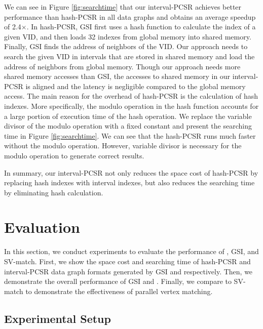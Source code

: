 We can see in Figure \ref{fig:searchtime} that our interval-PCSR achieves better performance than hash-PCSR in all data graphs and obtains
an average speedup of 2.4$\times$. In hash-PCSR, GSI first uses a hash function to calculate the index of a given VID, and then loads 32
indexes from global memory into shared memory. Finally, GSI finds the address of neighbors of the VID. Our approach needs to search the
given VID in intervals that are stored in shared memory and load the address of neighbors from global memory. Though our approach needs
more shared memory accesses than GSI, the accesses to shared memory in our interval-PCSR is aligned and the latency is negligible compared
to the global memory access. The main reason for the overhead of hash-PCSR is the calculation of hash indexes. More specifically, the
modulo operation in the hash function accounts for a large portion of execution time of the hash operation. We replace the variable divisor
of the modulo operation with a fixed constant and present the searching time in Figure \ref{fig:searchtime}. We can see that the hash-PCSR
runs much faster without the modulo operation. However, variable divisor is necessary for the modulo operation to generate correct results.

In summary, our interval-PCSR not only reduces the space cost of hash-PCSR by replacing hash indexes with interval indexes, but also
reduces the searching time by eliminating hash calculation.


\section{Evaluation}
In this section, we conduct experiments to evaluate the performance of \SystemName, GSI, and SV-match. First, we show the space cost and searching time of hash-PCSR and interval-PCSR data graph formats generated by GSI and \SystemName respectively. Then, we demonstrate the overall performance of GSI and \SystemName. Finally, we compare \SystemName to SV-match to demonstrate the effectiveness of parallel vertex matching.

\subsection{Experimental Setup}


